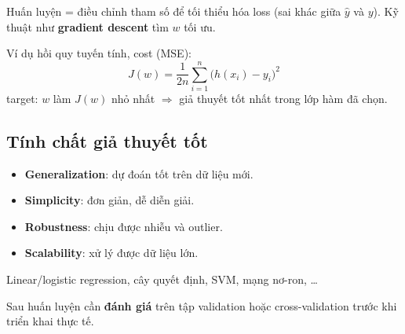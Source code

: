 \begin{ynghia}[title={Tối ưu hoá}]
Huấn luyện = điều chỉnh tham số để tối thiểu hóa loss (sai khác giữa $\hat{y}$ và $y$).
Kỹ thuật như \textbf{gradient descent} tìm $w$ tối ưu.

Ví dụ hồi quy tuyến tính, cost (MSE):
\[
J(w) = \frac{1}{2n}\sum_{i=1}^{n}\bigl(h(x_i) - y_i\bigr)^2
\]
target: $w$ làm $J(w)$ nhỏ nhất $\Rightarrow$ giả thuyết tốt nhất trong lớp hàm đã chọn.
\end{ynghia}

\subsection{Tính chất giả thuyết tốt}

\begin{tinhchat}[title={Một giả thuyết / mô hình tốt nên}]
\begin{itemize}
  \item \textbf{Generalization}: dự đoán tốt trên dữ liệu mới.
  \item \textbf{Simplicity}: đơn giản, dễ diễn giải.
  \item \textbf{Robustness}: chịu được nhiễu và outlier.
  \item \textbf{Scalability}: xử lý được dữ liệu lớn.
\end{itemize}
\end{tinhchat}

\begin{phuongphap}[title={Các học thuật toán sinh giả thuyết}]
Linear/logistic regression, cây quyết định, SVM, mạng nơ-ron, \ldots

Sau huấn luyện cần \textbf{đánh giá} trên tập validation hoặc cross-validation trước khi triển khai thực tế.
\end{phuongphap}

